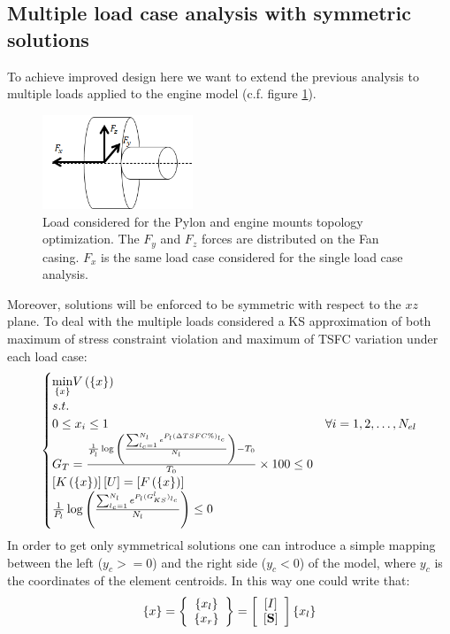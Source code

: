  \subsection{Multiple load case analysis with symmetric solutions}
 To achieve improved design here we want to extend the previous analysis to multiple loads applied to the engine model (c.f. figure \ref{fig.2.23}).
  \begin{figure}[ht]
  \centering
  \includegraphics[width=0.4\textwidth]{images/Ch2/Design_problem_multi_load}
  \caption{Load considered for the Pylon and engine mounts topology optimization. The $F_y$ and $F_z$ forces are distributed on the Fan casing. $F_x$ is the same load case considered for the single load case analysis.}
  \label{fig.2.23}
  \end{figure}
  Moreover, solutions will be enforced to be symmetric with respect to the $xz$ plane.  To deal with the multiple loads considered a KS approximation of both maximum of stress constraint violation and maximum of TSFC variation under each load case:
 \begin{equation}
 \label{topoeq3}
 \begin{cases}
 \underset{\lbrace x\rbrace}{\min} V\left(\lbrace x\rbrace\right)& \\
 s.t. & \\ 0\leq x_i \leq 1  & \forall i=1,2,\dots,N_{el}\\
 G_T=\frac{\frac{1}{P_l}\log{\left(\frac{\sum_{l_c=1}^{N_l}e^{P_l(\Delta TSFC \% )_{l_c}}}{N_l}\right)}-T_0}{T_0}\times 100 \leq 0 & \\
 \left[K\left(\lbrace x\rbrace\right)\right]\left[{U}\right] = \left[{ F \left(\lbrace x\rbrace\right)}\right]& \\
 \frac{1}{P_l}\log{\left(\frac{\sum_{l_c=1}^{N_l}e^{P_l(G^{l}_{KS})_{l_c}}}{N_l}\right)}\leq 0
 \end{cases}
 \end{equation}
 In order to get only symmetrical solutions one can introduce a simple mapping between the left ($y_c>= 0$) and the right side ($y_c< 0$) of the model, where $y_c$ is the coordinates of the element centroids. In this way one could write that:
 \begin{equation}
 \left\lbrace{x}\right \rbrace=\left\lbrace{\begin{array}{c}
 \ensuremath\left\lbrace{x_l}\right \rbrace\\
  \ensuremath\left\lbrace{x_r}\right \rbrace
 \end{array}}\right \rbrace=\left[{\begin{array}{c}
  \left[{I}\right]\\
   \left[{\mathbf{S}}\right]
   \end{array}}\right]\left\lbrace{x_l}\right \rbrace
 \end{equation}
